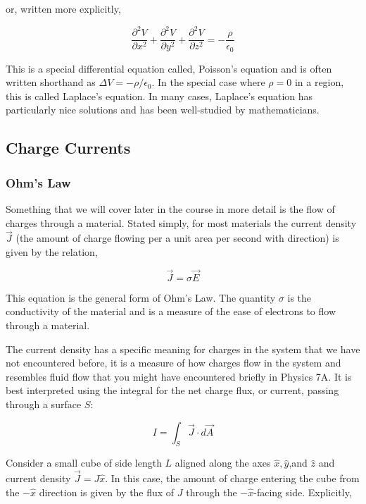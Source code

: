 \documentclass[12pt]{book}
\begin{document}
or, written more explicitly,

\begin{equation*}
 \frac{\partial^2 V}{\partial x^2} +\frac{\partial^2 V}{\partial y^2}+\frac{\partial^2 V}{\partial z^2} = -\frac{\rho}{\epsilon_0}
\end{equation*}

This is a special differential equation called, Poisson’s equation and is often written shorthand as $\Delta V = -\rho/\epsilon_0.$  In the special case where $\rho = 0$ in a region, this is called Laplace’s equation. In many cases, Laplace’s equation has particularly nice solutions and has been well-studied by mathematicians.

\subsection{Charge Currents}

\subsubsection{Ohm’s Law}

Something that we will cover later in the course in more detail is the flow of charges through a material.
Stated simply, for most materials the current density $\vec{J}$ (the amount of charge flowing per a unit area per second with direction) is given by the relation,

\begin{equation*}
 \vec{J} = \sigma \vec{E}
\end{equation*}

This equation is the general form of Ohm’s Law. The quantity $\sigma$ is the conductivity of the material and is a measure of the ease of electrons to flow through a material.

The current density has a specific meaning for charges in the system that we have not encountered before,
it is a measure of how charges flow in the system and resembles fluid flow that you might have encountered
briefly in Physics 7A. It is best interpreted using the integral for the net charge flux, or current, passing through a surface $S$:

\begin{equation*}
 I = \int_S \vec{J} \cdot d\vec{A}
\end{equation*}

Consider a small cube of side length $L$ aligned along the axes $\hat{x},\hat{y}$,and $\hat{z}$ and current density $\vec{J} = J \hat{x}$. In this case, the amount of charge entering the cube from the $-\hat{x}$ direction is given by the flux of $J$ through the $-\hat{x}$-facing side. Explicitly,
\end{document}
